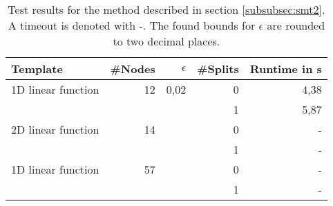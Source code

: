     \begin{table}
        \centering
            \begin{tabular}{|l|r|r|r|r|}
                 \hline
                 Template &  \#Nodes    & $\epsilon$ & \#Splits     & Runtime in \si{\s}\\
                 \hline
                 \hline
                 1D linear function        &    12             & 0,02         & 0& 4,38\\
                                           &                   &              & 1& 5,87\\ \hline
                 2D linear function        &    14             &           & 0& -\\
                                           &                   &           & 1& -\\ \hline
                 1D linear function        &    57             &             & 0& -\\
                                           &                   &           & 1& -\\ \hline
                 
            \end{tabular}
        \caption{Test results for the method described in section \ref{subsubsec:smt2}. A timeout is denoted with -. The found bounds for $\epsilon$ are rounded to two decimal places.}
        \label{tab:smt_optimize}
    \end{table}
